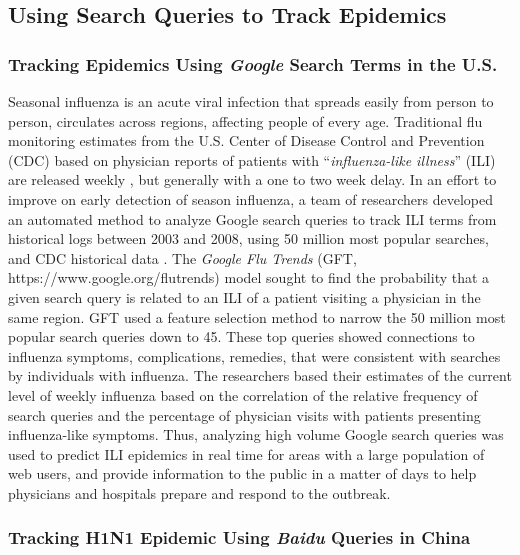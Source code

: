 \documentclass[sigconf]{acmart}
\begin{document}
\subsection{Using Search Queries to Track Epidemics}

\subsubsection{Tracking Epidemics Using {\itshape Google} Search Terms in the U.S.}

Seasonal influenza is an acute viral infection that spreads easily from person to 
person, circulates across regions, affecting people of every age. Traditional flu 
monitoring estimates from the U.S. Center of Disease Control and Prevention (CDC) 
based on physician reports of patients with ``{\it influenza-like illness}'' (ILI) are 
released weekly \cite{cdc17}, but generally with a one to two week delay. In an effort 
to improve on early detection of season influenza, a team of researchers developed an 
automated method to analyze Google search queries to track ILI terms from historical 
logs between 2003 and 2008, using 50 million most popular searches, and CDC historical 
data \cite{ginsburg09}. The {\it Google Flu Trends} (GFT, https://www.google.org/flutrends)
model sought to find the probability that a given search query is related to an ILI of a 
patient visiting a physician in the same region. GFT used a feature selection method to 
narrow  the 50 million most popular search queries down to 45. These top queries showed 
connections to influenza symptoms, complications, remedies, that were consistent with 
searches by individuals with influenza. The researchers based their estimates of the 
current level of weekly influenza based on the correlation of the relative frequency 
of search queries and the percentage of physician visits with patients presenting 
influenza-like symptoms. Thus, analyzing high volume Google search queries was used 
to predict ILI epidemics in real time for areas with a large population of web users, 
and provide information to the public in a matter of days to help physicians and 
hospitals prepare and respond to the outbreak. 

\subsubsection{Tracking H1N1 Epidemic Using {\itshape Baidu} Queries in China}
\end{document}
